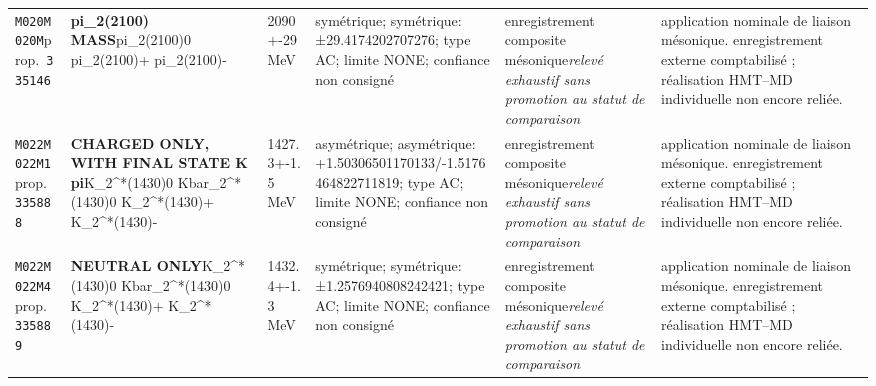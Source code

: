 \begin{landscape}
\begin{longtable}{L{1.85cm}L{4.45cm}L{2.35cm}L{4.05cm}L{3.35cm}L{7.15cm}}
\texttt{M020}\newline \texttt{M020M}\newline prop.\ \texttt{335146} & \textbf{pi\_\allowbreak{}2(2100) MASS}\newline pi\_\allowbreak{}2(2100)0 \textbar{}\allowbreak{} pi\_\allowbreak{}2(2100)+ \textbar{}\allowbreak{} pi\_\allowbreak{}2(2100)- & 2090+-29\,MeV & symétrique; symétrique: ±29.4174202707276; type AC; limite NONE; confiance non consigné & enregistrement composite mésonique\newline \emph{relevé exhaustif sans promotion au statut de comparaison} & application nominale de liaison mésonique. enregistrement externe comptabilisé ; réalisation HMT--MD individuelle non encore reliée. \\
\texttt{M022}\newline \texttt{M022M1}\newline prop.\ \texttt{335888} & \textbf{CHARGED ONLY, WITH FINAL STATE K pi}\newline K\_\allowbreak{}2\textasciicircum{}*(1430)0 \textbar{}\allowbreak{} Kbar\_\allowbreak{}2\textasciicircum{}*(1430)0 \textbar{}\allowbreak{} K\_\allowbreak{}2\textasciicircum{}*(1430)+ \textbar{}\allowbreak{} K\_\allowbreak{}2\textasciicircum{}*(1430)- & 1427.3+-1.5\,MeV & asymétrique; asymétrique: +1.50306501170133/-1.5176464822711819; type AC; limite NONE; confiance non consigné & enregistrement composite mésonique\newline \emph{relevé exhaustif sans promotion au statut de comparaison} & application nominale de liaison mésonique. enregistrement externe comptabilisé ; réalisation HMT--MD individuelle non encore reliée. \\
\texttt{M022}\newline \texttt{M022M4}\newline prop.\ \texttt{335889} & \textbf{NEUTRAL ONLY}\newline K\_\allowbreak{}2\textasciicircum{}*(1430)0 \textbar{}\allowbreak{} Kbar\_\allowbreak{}2\textasciicircum{}*(1430)0 \textbar{}\allowbreak{} K\_\allowbreak{}2\textasciicircum{}*(1430)+ \textbar{}\allowbreak{} K\_\allowbreak{}2\textasciicircum{}*(1430)- & 1432.4+-1.3\,MeV & symétrique; symétrique: ±1.2576940808242421; type AC; limite NONE; confiance non consigné & enregistrement composite mésonique\newline \emph{relevé exhaustif sans promotion au statut de comparaison} & application nominale de liaison mésonique. enregistrement externe comptabilisé ; réalisation HMT--MD individuelle non encore reliée. \\

\end{longtable}
\end{landscape}
